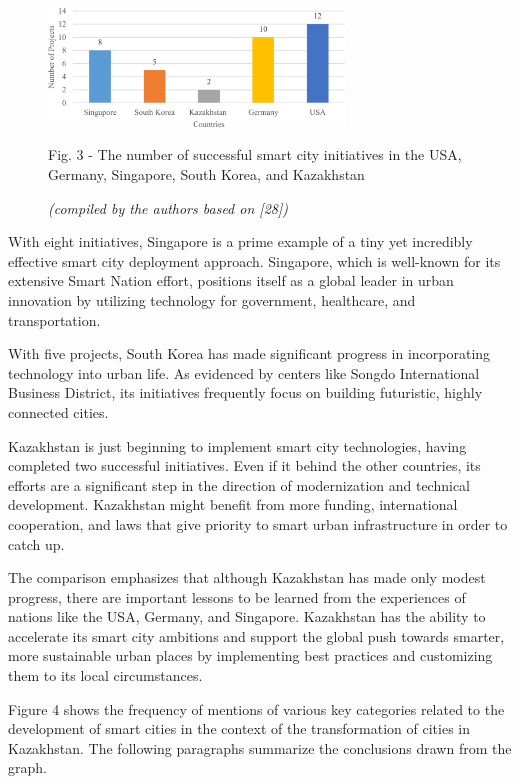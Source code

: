 \begin{figure}[H]
	\centering
	\includegraphics[width=0.7\textwidth]{media/ekon/Graph_14}
	\caption*{Fig. 3 - The number of successful smart city initiatives in the USA, Germany, Singapore, South Korea, and Kazakhstan}
	\caption*{\normalfont \emph{(compiled by the authors based on {[}28{]})}} 
\end{figure}

\begin{multicols}{2}
With eight initiatives, Singapore is a prime example of a tiny yet
incredibly effective smart city deployment approach. Singapore, which is
well-known for its extensive Smart Nation effort, positions itself as a
global leader in urban innovation by utilizing technology for
government, healthcare, and transportation.

With five projects, South Korea has made significant progress in
incorporating technology into urban life. As evidenced by centers like
Songdo International Business District, its initiatives frequently focus
on building futuristic, highly connected cities.

Kazakhstan is just beginning to implement smart city technologies,
having completed two successful initiatives. Even if it behind the other
countries, its efforts are a significant step in the direction of
modernization and technical development. Kazakhstan might benefit from
more funding, international cooperation, and laws that give priority to
smart urban infrastructure in order to catch up.

The comparison emphasizes that although Kazakhstan has made only modest
progress, there are important lessons to be learned from the experiences
of nations like the USA, Germany, and Singapore. Kazakhstan has the
ability to accelerate its smart city ambitions and support the global
push towards smarter, more sustainable urban places by implementing best
practices and customizing them to its local circumstances.

Figure 4 shows the frequency of mentions of various key categories
related to the development of smart cities in the context of the
transformation of cities in Kazakhstan. The following paragraphs
summarize the conclusions drawn from the graph.


\end{multicols}
